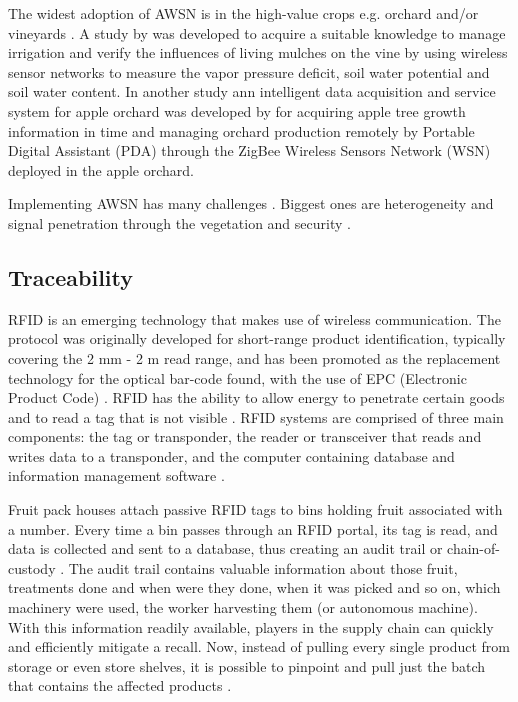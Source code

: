\documentclass[review]{elsarticle}
\begin{document}
    The widest adoption of AWSN is in the high-value crops e.g. orchard and/or vineyards \cite{Vougioukas_2013}. A study by \cite{Torres_2017} was developed to acquire a suitable knowledge to manage irrigation and verify the influences of living mulches on the vine by using wireless sensor networks to measure the vapor pressure deficit, soil water potential and soil water content. In another study ann intelligent data acquisition and service system for apple orchard was developed by \cite{Guo2014146} for acquiring apple tree growth information in time and managing orchard production remotely by Portable Digital Assistant (PDA) through the ZigBee Wireless Sensors Network (WSN) deployed in the apple orchard.

    Implementing AWSN has many challenges \cite{Tzounis_2017}. Biggest ones are heterogeneity and signal penetration through the vegetation \cite{Vougioukas_2013} and security \cite{Sicari_2015}.


    \subsection{Traceability}
    RFID is an emerging technology that makes use of wireless communication. The protocol was originally developed for short-range product identification, typically covering the 2 mm - 2 m read range, and has been promoted as the replacement technology for the optical bar-code found, with the use of EPC (Electronic Product Code) \cite{Ruiz_Garcia_2009}. RFID has the ability to allow energy to penetrate certain goods and to read a tag that is not visible \cite{dobkin2005radio}. RFID systems are comprised of three main components: the tag or transponder, the reader or transceiver that reads and writes data to a transponder, and the computer containing database and information management software \cite{li2006radio}.

    Fruit pack houses attach passive RFID tags to bins holding fruit associated with a number. Every time a bin passes through an RFID portal, its tag is read, and data is collected and sent to a database, thus creating an audit trail or chain-of-custody \cite{Gautam_2017}. The audit trail contains valuable information about those fruit, treatments done and when were they done, when it was picked and so on, which machinery were used, the worker harvesting them (or autonomous machine). With this information readily available, players in the supply chain can quickly and efficiently mitigate a recall. Now, instead of pulling every single product from storage or even store shelves, it is possible to pinpoint and pull just the batch that contains the affected products \cite{Ghaani_2016}.
\end{document}
